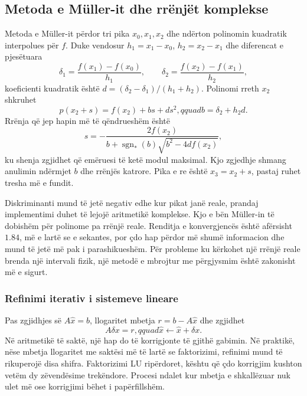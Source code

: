 \documentclass[11pt,oneside,openany]{book}
\begin{document}


\subsection{Metoda e Müller-it dhe rrënjët komplekse}
Metoda e Müller-it përdor tri pika $x_0,x_1,x_2$ dhe ndërton polinomin kuadratik interpolues për $f$. Duke vendosur $h_1=x_1-x_0$, $h_2=x_2-x_1$ dhe diferencat e pjesëtuara
\begin{equation}
 \delta_1=\frac{f(x_1)-f(x_0)}{h_1},\qquad
 \delta_2=\frac{f(x_2)-f(x_1)}{h_2},
\end{equation}
koeficienti kuadratik është $d=(\delta_2-\delta_1)/(h_1+h_2)$. Polinomi rreth $x_2$ shkruhet
\begin{equation}
 p(x_2+s)=f(x_2)+bs+ds^2,qquad b=\delta_2+h_2d.
\end{equation}
Rrënja që jep hapin më të qëndrueshëm është
\begin{equation}
 s=-\frac{2f(x_2)}{b+\operatorname{sgn}_*(b)\sqrt{b^2-4df(x_2)}},
\end{equation}
ku shenja zgjidhet që emëruesi të ketë modul maksimal. Kjo zgjedhje shmang anulimin ndërmjet $b$ dhe rrënjës katrore. Pika e re është $x_3=x_2+s$, pastaj ruhet tresha më e fundit.

Diskriminanti mund të jetë negativ edhe kur pikat janë reale, prandaj implementimi duhet të lejojë aritmetikë komplekse. Kjo e bën Müller-in të dobishëm për polinome pa rrënjë reale. Renditja e konvergjencës është afërsisht $1.84$, më e lartë se e sekantes, por çdo hap përdor më shumë informacion dhe mund të jetë më pak i parashikueshëm. Për probleme ku kërkohet një rrënjë reale brenda një intervali fizik, një metodë e mbrojtur me përgjysmim është zakonisht më e sigurt.

\subsubsection{Refinimi iterativ i sistemeve lineare}
Pas zgjidhjes së $A\widehat x=b$, llogaritet mbetja $r=b-A\widehat x$ dhe zgjidhet
\begin{equation}
 A\delta x=r,qquad \widehat x\leftarrow\widehat x+\delta x.
\end{equation}
Në aritmetikë të saktë, një hap do të korrigjonte të gjithë gabimin. Në praktikë, nëse mbetja llogaritet me saktësi më të lartë se faktorizimi, refinimi mund të rikuperojë disa shifra. Faktorizimi LU ripërdoret, kështu që çdo korrigjim kushton vetëm dy zëvendësime trekëndore. Procesi ndalet kur mbetja e shkallëzuar nuk ulet më ose korrigjimi bëhet i papërfillshëm.
\end{document}
